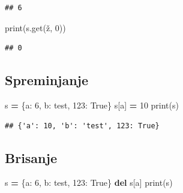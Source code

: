 \documentclass[
]{book}
\newenvironment{Shaded}{\begin{snugshade}}{\end{snugshade}}
\newcommand{\BuiltInTok}[1]{#1}
\newcommand{\DecValTok}[1]{\textcolor[rgb]{0.00,0.00,0.81}{#1}}
\newcommand{\KeywordTok}[1]{\textcolor[rgb]{0.13,0.29,0.53}{\textbf{#1}}}
\newcommand{\NormalTok}[1]{#1}
\newcommand{\OperatorTok}[1]{\textcolor[rgb]{0.81,0.36,0.00}{\textbf{#1}}}
\newcommand{\StringTok}[1]{\textcolor[rgb]{0.31,0.60,0.02}{#1}}
\newcommand{\VariableTok}[1]{\textcolor[rgb]{0.00,0.00,0.00}{#1}}
\begin{document}
\begin{verbatim}
## 6
\end{verbatim}

\begin{Shaded}
\begin{Highlighting}[]
\BuiltInTok{print}\NormalTok{(s.get(}\StringTok{\textquotesingle{}ž\textquotesingle{}}\NormalTok{, }\DecValTok{0}\NormalTok{))}
\end{Highlighting}
\end{Shaded}

\begin{verbatim}
## 0
\end{verbatim}

\hypertarget{spreminjanje-1}{%
\subsection{Spreminjanje}\label{spreminjanje-1}}

\begin{Shaded}
\begin{Highlighting}[]
\NormalTok{s }\OperatorTok{=}\NormalTok{ \{}\StringTok{\textquotesingle{}a\textquotesingle{}}\NormalTok{: }\DecValTok{6}\NormalTok{, }\StringTok{\textquotesingle{}b\textquotesingle{}}\NormalTok{: }\StringTok{\textquotesingle{}test\textquotesingle{}}\NormalTok{, }\DecValTok{123}\NormalTok{: }\VariableTok{True}\NormalTok{\}}
\NormalTok{s[}\StringTok{\textquotesingle{}a\textquotesingle{}}\NormalTok{] }\OperatorTok{=} \DecValTok{10}
\BuiltInTok{print}\NormalTok{(s)}
\end{Highlighting}
\end{Shaded}

\begin{verbatim}
## {'a': 10, 'b': 'test', 123: True}
\end{verbatim}

\hypertarget{brisanje}{%
\subsection{Brisanje}\label{brisanje}}

\begin{Shaded}
\begin{Highlighting}[]
\NormalTok{s }\OperatorTok{=}\NormalTok{ \{}\StringTok{\textquotesingle{}a\textquotesingle{}}\NormalTok{: }\DecValTok{6}\NormalTok{, }\StringTok{\textquotesingle{}b\textquotesingle{}}\NormalTok{: }\StringTok{\textquotesingle{}test\textquotesingle{}}\NormalTok{, }\DecValTok{123}\NormalTok{: }\VariableTok{True}\NormalTok{\}}
\KeywordTok{del}\NormalTok{ s[}\StringTok{\textquotesingle{}a\textquotesingle{}}\NormalTok{]}
\BuiltInTok{print}\NormalTok{(s)}
\end{Highlighting}
\end{Shaded}
\end{document}
